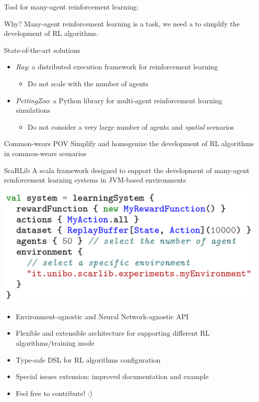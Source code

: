 \documentclass[presentation, 9pt, aspectratio=169]{beamer}\mode<presentation>{\usetheme{AMSBolognaFC}}
\newcommand{\hsplit}[2]{
\begin{minipage}{0.48\textwidth}
#1
\end{minipage}
\hfill
\begin{minipage}{0.48\textwidth}
#2
\end{minipage}
}
\begin{document}
\begin{frame}{Tool for many-agent reinforcement learning: }
	\begin{alertblock}{Why?}
		Many-agent reinforcement learning is a  task, we need a  to simplify the development of RL algorithms.
	\end{alertblock}
	\begin{exampleblock}{State-of-the-art solutions}
		\begin{itemize}
			\item \emph{Ray}: a distributed execution framework for reinforcement learning
			\begin{itemize}
				\item Do not scale with the number of agents
			\end{itemize} 
			\item \emph{PettingZoo}: a Python library for multi-agent reinforcement learning simulations
			\begin{itemize}
				\item Do not consider a very large number of agents and \emph{spatial} scenarios
			\end{itemize}
		\end{itemize}
	\end{exampleblock}
	\begin{exampleblock}{Common-wears POV}
		Simplify and homogenize the development of RL algorithms in common-wears scenarios \faArrowRight \, 
	\end{exampleblock}
\end{frame}
\begin{frame}{ScaRLib}
 A scala framework designed to support the development of many-agent reinforcement learning systems in JVM-based environments
\vspace{0.5cm}

 \hsplit{\includegraphics[width=\textwidth]{img/dsl-example}}{
	\begin{itemize}
		\item Environment-agnostic and Neural Network-agnostic API
		\item Flexible and extensible architecture for supporting different RL algorithms/training
		mode
		\item Type-safe DSL for RL algorithms configuration
		\item Special issues extension: improved documentation and example
		\item Feel free to contribute! :)
	\end{itemize}
 }
\end{frame}
\end{document}
